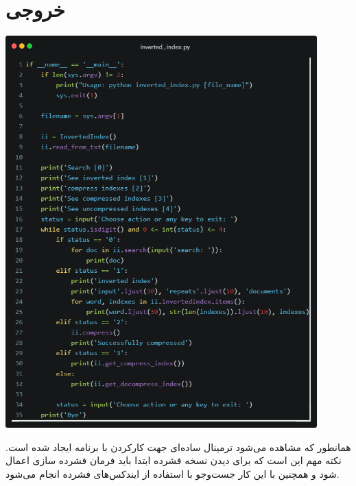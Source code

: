 \documentclass[12pt, dvipsnames, svgnames, x11names,]{article}
\begin{document}
		
	\section{خروجی}
		
		\begin{center}
			\includegraphics[width=12cm]{images/10.png} \par
		\end{center}
		\vspace{0.1cm}
		{\normalsize 
		همانطور که مشاهده می‌شود ترمینال ساده‌ای جهت کارکردن با برنامه ایجاد شده است. نکته مهم این است که برای دیدن نسخه فشرده ابتدا باید فرمان فشرده سازی اعمال شود و همچنین با این کار جست‌وجو با استفاده از ایندکس‌های فشرده انجام می‌شود.
		}		

	
\end{document}
